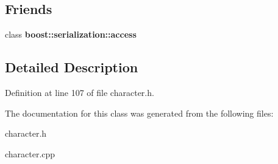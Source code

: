 \subsection*{Friends}
\begin{DoxyCompactItemize}
\item 
\hypertarget{class_player_ac98d07dd8f7b70e16ccb9a01abf56b9c}{}\label{class_player_ac98d07dd8f7b70e16ccb9a01abf56b9c} 
class {\bfseries boost\+::serialization\+::access}
\end{DoxyCompactItemize}


\subsection{Detailed Description}


Definition at line 107 of file character.\+h.



The documentation for this class was generated from the following files\+:\begin{DoxyCompactItemize}
\item 
character.\+h\item 
character.\+cpp\end{DoxyCompactItemize}
